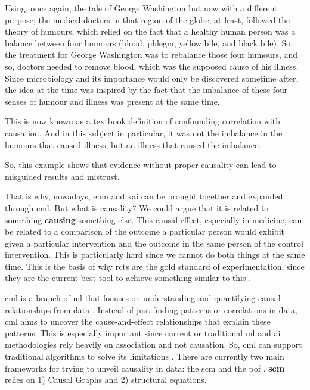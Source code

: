
Using, once again, the tale of George Washington but now with a different purpose; the medical doctors in that region of the globe, at least, followed the theory of humours, which relied on the fact that a healthy human person was a balance between four humours (blood, phlegm, yellow bile, and black bile). So, the treatment for George Washington was to rebalance those four humours, and so, doctors needed to remove blood, which was the supposed cause of his illness. Since microbiology and its importance would only be discovered sometime after, the idea at the time was inspired by the fact that the imbalance of these four senses of humour and illness was present at the same time.

This is now known as a textbook definition of confounding correlation with causation. And in this subject in particular, it was not the imbalance in the humours that caused illness, but an illness that caused the imbalance.

So, this example shows that evidence without proper causality can lead to misguided results and mistrust.

That is why, nowadays, \ac{ebm} and \ac{xai} can be brought together and expanded through \ac{cml}. But what is causality? We could argue that it is related to something \textbf{causing} something else. This causal effect, especially in medicine, can be related to a comparison of the outcome a particular person would exhibit given a particular intervention and the outcome in the same person of the control intervention. This is particularly hard since we cannot do both things at the same time. This is the basis of why \acp{rct} are the gold standard of experimentation, since they are the current best tool to achieve something similar to this \cite{10.7551/mitpress/14244.001.0001}.


\ac{cml} is a branch of \ac{ml} that focuses on understanding and quantifying causal relationships from data \cite{hernanDefinitionCausalEffect2004}. Instead of just finding patterns or correlations in data, \ac{cml} aims to uncover the cause-and-effect relationships that explain these patterns.
This is especially important since current or traditional \ac{ml} and \ac{ai} methodologies rely heavily on association and not causation. So, \ac{cml} can support traditional algorithms to solve its limitations \cite{pearlTheoreticalImpedimentsMachine2018}.
There are currently two main frameworks for trying to unveil causality in data: the \ac{scm}  and the \ac{pof} \cite{shiLearningCausalEffects2022b}. \textbf{\ac{scm}} relies on 1) Causal Graphs and 2) structural equations.

